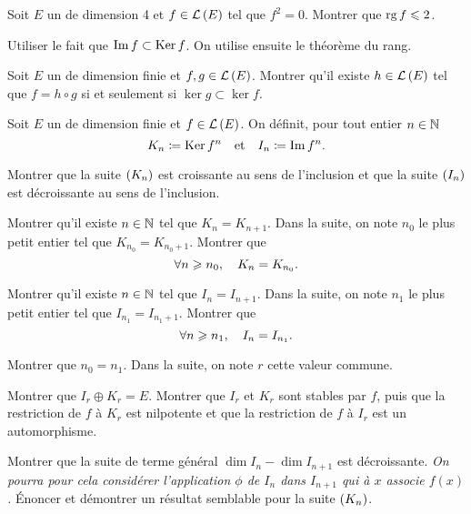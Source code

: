 \documentclass{magnolia}
\begin{document}
Soit $E$ un \Kev de dimension 4 et $f\in\mathcal{L}\left(E\right)$ tel que $f^2=0$. Montrer
que $\operatorname{rg} f\leqslant 2$. 
\begin{sol}
Utiliser le fait que $\operatorname{Im} f\subset\mathop{\rm Ker} f$. On utilise ensuite le théorème
du rang. 
\end{sol}

Soit $E$ un \Kev de dimension finie et $f,g\in\mathcal{L}\left(E\right)$. Montrer qu'il existe
$h\in\mathcal{L}\left(E\right)$ tel que $f=h\circ g$ si et seulement si $\ker g\subset \ker f$.

Soit $E$ un \Kev de dimension finie et $f\in\mathcal{L}\left(E\right)$. On définit, pour tout
entier $n\in\mathbb{N}$
\[K_n\coloneqq\mathop{\rm Ker} f^n \quad \text{et} \quad I_n\coloneqq\operatorname{Im} f^n.\]
\begin{questions}
\question 
  \begin{questions}
  \question Montrer que la suite $\left(K_n\right)$ est croissante au sens de l'inclusion et
    que la suite $\left(I_n\right)$ est décroissante au sens de l'inclusion.
  \question 
    \begin{questions}
    \question Montrer qu'il existe $n\in\mathbb{N}$ tel que $K_{n}=K_{n+1}$. Dans la
      suite, on note $n_0$ le plus petit entier tel que $K_{n_0}=K_{n_0+1}$.
    \question Montrer que
      \[\forall n \geqslant n_0 ,\quad K_n=K_{n_0}.\]
    \end{questions}
  \question 
    \begin{questions}
    \question Montrer qu'il existe $n\in\mathbb{N}$ tel que $I_{n}=I_{n+1}$. Dans la
      suite, on note $n_1$ le plus petit entier tel que $I_{n_1}=I_{n_1+1}$.
    \question Montrer que
      \[\forall n \geqslant n_1 ,\quad I_n=I_{n_1}.\]
    \end{questions}
  \question Montrer que $n_0=n_1$. Dans la suite, on note $r$ cette valeur commune.
  \end{questions}
\question 
  \begin{questions}
  \question Montrer que $I_r \oplus K_r = E$.
  \question Montrer que $I_r$ et $K_r$ sont stables par $f$, puis que la
    restriction de $f$ à $K_r$ est nilpotente et que la restriction de $f$ à
    $I_r$ est un automorphisme.
  \end{questions}
\question 
  \begin{questions}
  \question Montrer que la suite de terme général $\dim I_{n} - \dim I_{n+1}$
    est décroissante. {\it On pourra pour cela considérer l'application
    $\phi$ de $I_n$ dans $I_{n+1}$ qui à $x$ associe $f(x)$.}
  \question Énoncer et démontrer un résultat semblable pour la suite $\left(K_n\right)$. 
  \end{questions}
\end{questions}
\end{document}
